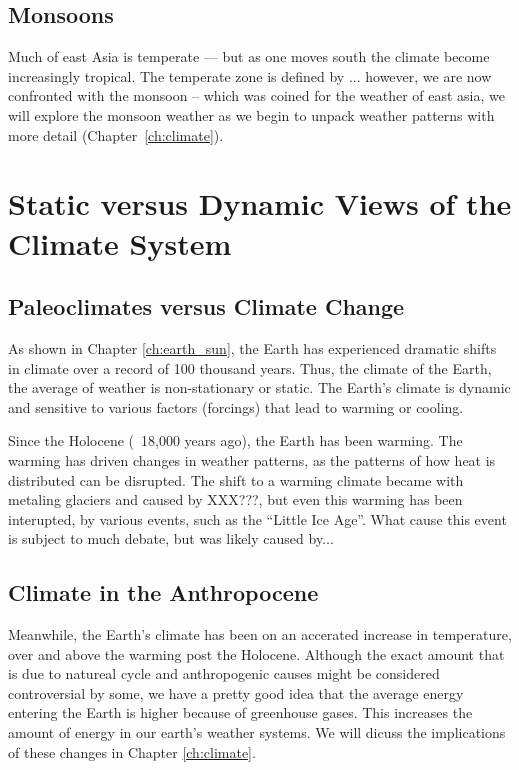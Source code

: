 \subsection{Monsoons}

Much of east Asia is temperate --- but as one moves south the climate become increasingly tropical. The temperate zone is defined by ... however, we are now confronted with the monsoon -- which was coined for the weather of east asia, we will explore the monsoon weather as we begin to unpack weather patterns with more detail (Chapter~\ref{ch:climate}). 


\section{Static versus Dynamic Views of the Climate System}

\subsection{Paleoclimates versus Climate Change}

As shown in Chapter \ref{ch:earth_sun}, the Earth has experienced dramatic shifts in climate over a record of 100 thousand years. Thus, the climate of the Earth, the average of weather is non-stationary or static. The Earth's climate is dynamic and sensitive to various factors (forcings) that lead to warming or cooling.

Since the Holocene (~18,000 years ago), the Earth has been warming. The warming has driven changes in weather patterns, as the patterns of how heat is distributed can be disrupted. The shift to a warming climate became with metaling glaciers and caused by XXX???, but even this warming has been interupted, by various events, such as the ``Little Ice Age''. What cause this event is subject to much debate, but was likely caused by...

\subsection{Climate in the Anthropocene}
 
Meanwhile, the Earth's climate has been on an accerated increase in temperature, over and above the warming post the Holocene. Although the exact amount that is due to natureal cycle and anthropogenic causes might be considered controversial by some, we have a pretty good idea that the average energy entering the Earth is higher because of greenhouse gases. This increases the amount of energy in our earth's weather systems. We will dicuss the implications of these changes in Chapter \ref{ch:climate}. 

